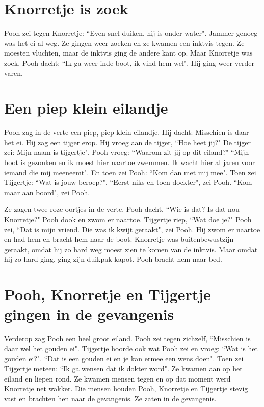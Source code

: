 \documentclass{article}
\begin{document}
\section{Knorretje is zoek}

Pooh zei tegen Knorretje: ``Even snel duiken, hij is onder water". Jammer genoeg was het ei al weg. Ze gingen weer zoeken en ze kwamen een inktvis tegen. Ze moesten vluchten, maar de inktvis ging de andere kant op. Maar Knorretje was zoek. Pooh dacht: ``Ik ga weer inde boot, ik vind hem wel". Hij ging weer verder varen.

\section{Een piep klein eilandje}

Pooh zag in de verte een piep, piep klein eilandje. Hij dacht: Misschien is daar het ei. Hij zag een tijger erop. Hij vroeg aan de tijger, ``Hoe heet jij?" De tijger zei: Mijn naam is tijgertje". Pooh vroeg: ``Waarom zit jij op dit eiland?" ``Mijn boot is gezonken en ik moest hier naartoe zwemmen. Ik wacht hier al jaren voor iemand die mij meeneemt". En toen zei Pooh: ``Kom dan met mij mee". Toen zei Tijgertje: ``Wat is jouw beroep?". ``Eerst niks en toen dockter", zei Pooh. ``Kom maar aan boord", zei Pooh.

Ze zagen twee roze oortjes in de verte. Pooh dacht, ``Wie is dat? Is dat nou Knorretje?" Pooh dook en zwom er naartoe. Tijgertje riep, ``Wat doe je?" Pooh zei, ``Dat is mijn vriend. Die was ik kwijt geraakt", zei Pooh. Hij zwom er naartoe en had hem en bracht hem naar de boot. Knorretje was buitenbewustzijn geraakt, omdat hij zo hard weg moest zien te komen van de inktvis. Maar omdat hij zo hard ging, ging zijn duikpak kapot. Pooh bracht hem naar bed.

\section{Pooh, Knorretje en Tijgertje gingen in de gevangenis}

Verderop zag Pooh een heel groot eiland. Pooh zei tegen zichzelf, ``Misschien is daar wel het gouden ei". Tijgertje hoorde ook wat Pooh zei en vroeg: ``Wat is het gouden ei?". ``Dat is een gouden ei en je kan ermee een wens doen". Toen zei Tijgertje meteen: ``Ik ga wensen dat ik dokter word". Ze kwamen aan op het eiland en liepen rond. Ze kwamen mensen tegen en op dat moment werd Knorretje net wakker. Die mensen houden Pooh, Knorretje en Tijgertje stevig vast en brachten hen naar de gevangenis. Ze zaten in de gevangenis.
\end{document}
